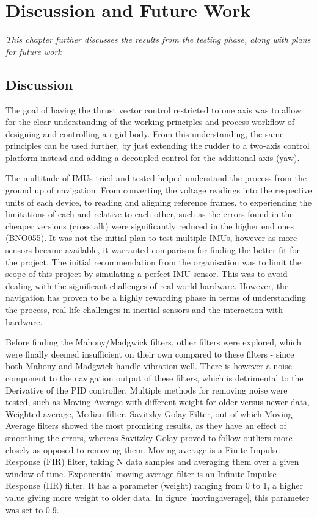 \chapter{Discussion and Future Work}

\textit{This chapter further discusses the results from the testing phase, along with plans for future work}

\section{Discussion}

The goal of having the thrust vector control restricted to one axis was to allow for the clear understanding of the working principles and process workflow of designing and controlling a rigid body. 
From this understanding, the same principles can be used further, by just extending the rudder to a two-axis control platform instead and adding a decoupled control for the additional axis (yaw). 

The multitude of IMUs tried and tested helped understand the process from the ground up of navigation. From converting the voltage readings into the respective units of each device, to reading and aligning reference frames, to experiencing the limitations of each and relative to each other, such as the errors found in the cheaper versions (crosstalk) were significantly reduced in the higher end ones (BNO055). It was not the initial plan to test multiple IMUs, however as more sensors became available, it warranted comparison for finding the better fit for the project. 
The initial recommendation from the organisation was to limit the scope of this project by simulating a perfect IMU sensor.
This was to avoid dealing with the significant challenges of real-world hardware. However, the navigation has proven to be a highly rewarding phase in terms of understanding the process, real life challenges in inertial sensors and the interaction with hardware.  
 
Before finding the Mahony/Madgwick filters, other filters were explored, which were finally deemed insufficient on their own compared to these filters - since both Mahony and Madgwick handle vibration well. There is however a noise component to the navigation output of these filters, which is detrimental to the Derivative of the PID controller. 
Multiple methods for removing noise were tested, such as Moving Average with different weight for older versus newer data, Weighted average, Median filter, Savitzky-Golay Filter, out of which Moving Average filters showed the most promising results, as they have an effect of smoothing the errors, whereas Savitzky-Golay proved to follow outliers more closely as opposed to removing them. 
Moving average is a Finite Impulse Response (FIR) filter, taking N data samples and averaging them over a given window of time. 
Exponential moving average filter is an Infinite Impulse Response (IIR) filter. It has a parameter (weight) ranging from 0 to 1, a higher value giving more weight to older data. In figure  \ref{movingaverage}, this parameter was set to 0.9. 

